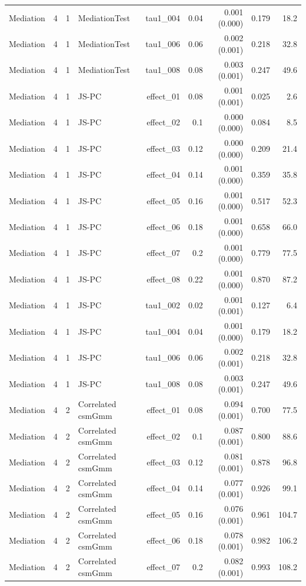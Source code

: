\begin{longtable}{lcclrrrrr}
Mediation & 4 & 1 & MediationTest & tau1\_004 & 0.04 & 0.001 (0.000) & 0.179 & 18.2\\
Mediation & 4 & 1 & MediationTest & tau1\_006 & 0.06 & 0.002 (0.001) & 0.218 & 32.8\\
Mediation & 4 & 1 & MediationTest & tau1\_008 & 0.08 & 0.003 (0.001) & 0.247 & 49.6\\
Mediation & 4 & 1 & JS-PC & effect\_01 & 0.08 & 0.001 (0.001) & 0.025 & 2.6\\
Mediation & 4 & 1 & JS-PC & effect\_02 & 0.1 & 0.000 (0.000) & 0.084 & 8.5\\
Mediation & 4 & 1 & JS-PC & effect\_03 & 0.12 & 0.000 (0.000) & 0.209 & 21.4\\
Mediation & 4 & 1 & JS-PC & effect\_04 & 0.14 & 0.001 (0.000) & 0.359 & 35.8\\
Mediation & 4 & 1 & JS-PC & effect\_05 & 0.16 & 0.001 (0.000) & 0.517 & 52.3\\
Mediation & 4 & 1 & JS-PC & effect\_06 & 0.18 & 0.001 (0.000) & 0.658 & 66.0\\
Mediation & 4 & 1 & JS-PC & effect\_07 & 0.2 & 0.001 (0.000) & 0.779 & 77.5\\
Mediation & 4 & 1 & JS-PC & effect\_08 & 0.22 & 0.001 (0.000) & 0.870 & 87.2\\
Mediation & 4 & 1 & JS-PC & tau1\_002 & 0.02 & 0.001 (0.001) & 0.127 & 6.4\\
Mediation & 4 & 1 & JS-PC & tau1\_004 & 0.04 & 0.001 (0.000) & 0.179 & 18.2\\
Mediation & 4 & 1 & JS-PC & tau1\_006 & 0.06 & 0.002 (0.001) & 0.218 & 32.8\\
Mediation & 4 & 1 & JS-PC & tau1\_008 & 0.08 & 0.003 (0.001) & 0.247 & 49.6\\
Mediation & 4 & 2 & Correlated csmGmm & effect\_01 & 0.08 & 0.094 (0.001) & 0.700 & 77.5\\
Mediation & 4 & 2 & Correlated csmGmm & effect\_02 & 0.1 & 0.087 (0.001) & 0.800 & 88.6\\
Mediation & 4 & 2 & Correlated csmGmm & effect\_03 & 0.12 & 0.081 (0.001) & 0.878 & 96.8\\
Mediation & 4 & 2 & Correlated csmGmm & effect\_04 & 0.14 & 0.077 (0.001) & 0.926 & 99.1\\
Mediation & 4 & 2 & Correlated csmGmm & effect\_05 & 0.16 & 0.076 (0.001) & 0.961 & 104.7\\
Mediation & 4 & 2 & Correlated csmGmm & effect\_06 & 0.18 & 0.078 (0.001) & 0.982 & 106.2\\
Mediation & 4 & 2 & Correlated csmGmm & effect\_07 & 0.2 & 0.082 (0.001) & 0.993 & 108.2\\

\end{longtable}

